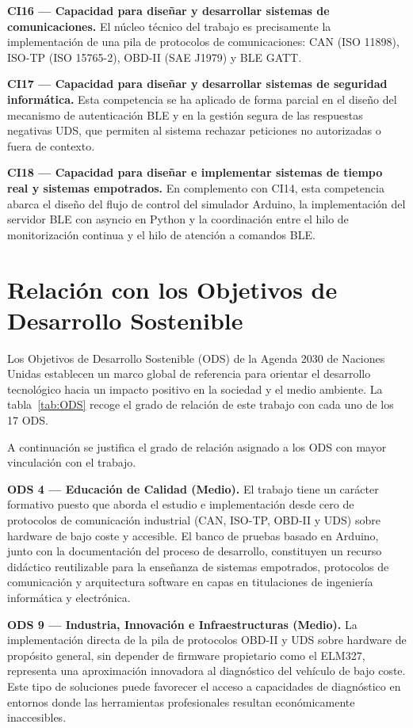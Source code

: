 \textbf{CI16 — Capacidad para diseñar y desarrollar sistemas de comunicaciones.} El núcleo técnico del trabajo es precisamente la implementación de una pila de protocolos de comunicaciones: CAN (ISO 11898), ISO-TP (ISO 15765-2), OBD-II (SAE J1979) y BLE GATT.

\textbf{CI17 — Capacidad para diseñar y desarrollar sistemas de seguridad informática.} Esta competencia se ha aplicado de forma parcial en el diseño del mecanismo de autenticación BLE y en la gestión segura de las respuestas negativas UDS, que permiten al sistema rechazar peticiones no autorizadas o fuera de contexto.

\textbf{CI18 — Capacidad para diseñar e implementar sistemas de tiempo real y sistemas empotrados.} En complemento con CI14, esta competencia abarca el diseño del flujo de control del simulador Arduino, la implementación del servidor BLE con asyncio en Python y la coordinación entre el hilo de monitorización continua y el hilo de atención a comandos BLE.


\section{Relación con los Objetivos de Desarrollo Sostenible}

Los Objetivos de Desarrollo Sostenible (ODS) de la Agenda 2030 de Naciones Unidas establecen un marco global de referencia para orientar el desarrollo tecnológico hacia un impacto positivo en la sociedad y el medio ambiente. La tabla~\ref{tab:ODS} recoge el grado de relación de este trabajo con cada uno de los 17 ODS.



A continuación se justifica el grado de relación asignado a los ODS con mayor vinculación con el trabajo.

\textbf{ODS 4 — Educación de Calidad (Medio).} El trabajo tiene un carácter formativo puesto que aborda el estudio e implementación desde cero de protocolos de comunicación industrial (CAN, ISO-TP, OBD-II y UDS) sobre hardware de bajo coste y accesible. El banco de pruebas basado en Arduino, junto con la documentación del proceso de desarrollo, constituyen un recurso didáctico reutilizable para la enseñanza de sistemas empotrados, protocolos de comunicación y arquitectura software en capas en titulaciones de ingeniería informática y electrónica.

\textbf{ODS 9 — Industria, Innovación e Infraestructuras (Medio).} La implementación directa de la pila de protocolos OBD-II y UDS sobre hardware de propósito general, sin depender de firmware propietario como el ELM327, representa una aproximación innovadora al diagnóstico del vehículo de bajo coste. Este tipo de soluciones puede favorecer el acceso a capacidades de diagnóstico en entornos donde las herramientas profesionales resultan económicamente inaccesibles.

